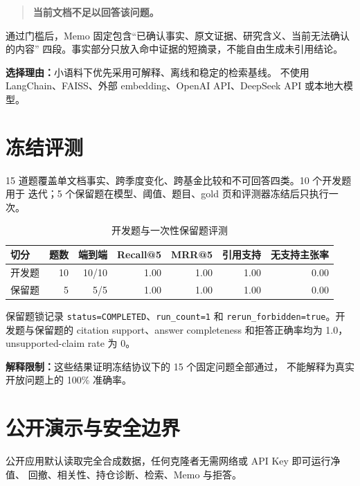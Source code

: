 \documentclass[UTF8,fontset=windows,11pt,a4paper]{ctexart}
\newcommand{\callout}[1]{
  \vspace{0.3em}
  \colorbox{paper}{
    \parbox{\dimexpr\linewidth-2\fboxsep}{
      \color{navy}#1
    }
  }
  \vspace{0.3em}
}
\begin{document}
\begin{quote}
\color{coral}\bfseries 当前文档不足以回答该问题。
\end{quote}

通过门槛后，Memo 固定包含“已确认事实、原文证据、研究含义、当前无法确认的内容”
四段。事实部分只放入命中证据的短摘录，不能自由生成未引用结论。

\callout{\textbf{选择理由：}小语料下优先采用可解释、离线和稳定的检索基线。
不使用 LangChain、FAISS、外部 embedding、OpenAI API、DeepSeek API 或本地大模型。}

\clearpage
\section{冻结评测}

15 道题覆盖单文档事实、跨季度变化、跨基金比较和不可回答四类。10 个开发题用于
迭代；5 个保留题在模型、阈值、题目、gold 页和评测器冻结后只执行一次。

\begin{table}[H]
\centering
\small
{}
\begin{tabular}{lrrrrrr}
\toprule
\textbf{切分} & \textbf{题数} & \textbf{端到端}
& \textbf{Recall@5} & \textbf{MRR@5}
& \textbf{引用支持} & \textbf{无支持主张率} \\
\midrule
开发题 & 10 & 10/10 & 1.00 & 1.00 & 1.00 & 0.00 \\
保留题 & 5 & 5/5 & 1.00 & 1.00 & 1.00 & 0.00 \\
\bottomrule
\end{tabular}
\caption{开发题与一次性保留题评测}
\end{table}

保留题锁记录 \texttt{status=COMPLETED}、\texttt{run\_count=1} 和
\texttt{rerun\_forbidden=true}。开发题与保留题的 citation support、answer
completeness 和拒答正确率均为 1.0，unsupported-claim rate 为 0。

\callout{\textbf{解释限制：}这些结果证明冻结协议下的 15 个固定问题全部通过，
不能解释为真实开放问题上的 100\% 准确率。}

\clearpage
\section{公开演示与安全边界}

公开应用默认读取完全合成数据，任何克隆者无需网络或 API Key 即可运行净值、
回撤、相关性、持仓诊断、检索、Memo 与拒答。
\end{document}
